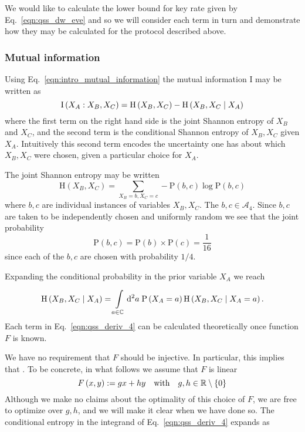 We would like to calculate the lower bound for key rate given by Eq.~\ref{eqn:qss_dw_eve} and so we will consider each term in turn and demonstrate how they may be calculated for the protocol described above.


\subsubsection{Mutual information}

Using Eq.~\ref{eqn:intro_mutual_information} the mutual information $\text{I}$ may be written as 
\begin{equation}\label{eqn:qss_deriv_1}
\text{I}\left(X_A : X_B, X_C\right) = \text{H}\left(X_B, X_C\right) - \text{H} \left(X_B, X_C \; \middle| \; X_A\right)
\end{equation}
where the first term on the right hand side is the joint Shannon entropy of $X_B$ and $X_C$, and the second term is the conditional Shannon entropy of $X_B, X_C$ given $X_A$. Intuitively this second term encodes the uncertainty one has about which $X_B, X_C$ were chosen, given a particular choice for $X_A$. 

The joint Shannon entropy may be written
\begin{equation}\label{eqn:qss_deriv_2}
\text{H}\left(X_B, X_C\right) = \sum_{X_B=b, X_C=c} - \text{P}\left(b, c\right) \log \text{P}\left(b, c\right)
\end{equation}
where $b, c$ are individual instances of variables $X_B, X_C$. The $b, c \in \mathcal{A}_4$. Since $b, c$ are taken to be independently chosen and uniformly random we see that the joint probability
\begin{equation}\label{eqn:qss_deriv_3}
\text{P}\left(b, c\right) = \text{P}\left(b\right)\times \text{P}\left(c\right) = \frac{1}{16}
\end{equation}
since each of the $b, c$ are chosen with probability $1/4$. 

Expanding the conditional probability in the prior  variable $X_A$ we reach

\begin{equation}\label{eqn:qss_deriv_4}
\text{H}\left(X_B, X_C \; \middle| \; X_A\right) = \int\limits_{a \in \mathbb{C}} \mathop{}\!\mathrm{d^2} a \; \text{P}\left(X_A = a\right) \text{H}\left(X_B, X_C \; \middle| \; X_A = a\right).
\end{equation}
Each term in Eq.~\ref{eqn:qss_deriv_4} can be calculated theoretically once function $F$ is known. 

We have no requirement that $F$ should be injective. In particular, this implies that . To be concrete, in what follows we assume that $F$ is linear
\begin{equation}\label{eqn:qss_F_linear}
F\left(x, y\right) := g x + h y \qq{with} g, h \in \mathbb{R}\setminus \left\{0\right\}
\end{equation} 
Although we make no claims about the optimality of this choice of $F$, we are free to optimize over $g, h$, and we will make it clear when we have done so. The conditional entropy in the integrand of Eq.~\ref{eqn:qss_deriv_4} expands as 

